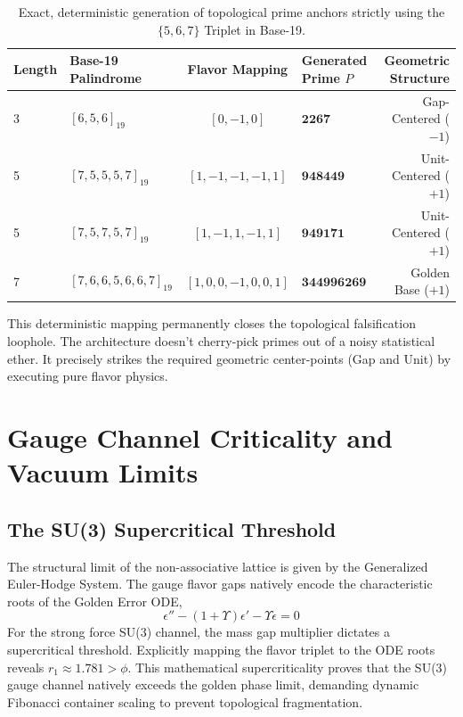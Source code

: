 \begin{table}[H]
\centering
\begin{tabular}{@{}llclr@{}}
\toprule
\textbf{Length} & \textbf{Base-19 Palindrome} & \textbf{Flavor Mapping} & \textbf{Generated Prime $P$} & \textbf{Geometric Structure} \\
\midrule
3 & $[6, 5, 6]_{19}$ & $[0, -1, 0]$ & $\mathbf{2267}$ & Gap-Centered ($-1$) \\
5 & $[7, 5, 5, 5, 7]_{19}$ & $[1, -1, -1, -1, 1]$ & $\mathbf{948449}$ & Unit-Centered ($+1$) \\
5 & $[7, 5, 7, 5, 7]_{19}$ & $[1, -1, 1, -1, 1]$ & $\mathbf{949171}$ & Unit-Centered ($+1$) \\
7 & $[7, 6, 6, 5, 6, 6, 7]_{19}$ & $[1, 0, 0, -1, 0, 0, 1]$ & $\mathbf{344996269}$ & Golden Base ($+1$) \\
\bottomrule
\end{tabular}
\caption{Exact, deterministic generation of topological prime anchors strictly using the $\{5, 6, 7\}$ Triplet in Base-19.}
\end{table}

This deterministic mapping permanently closes the topological falsification loophole. The architecture doesn't cherry-pick primes out of a noisy statistical ether. It precisely strikes the required geometric center-points (Gap and Unit) by executing pure flavor physics.


\section{Gauge Channel Criticality and Vacuum Limits}

\subsection{The SU(3) Supercritical Threshold}
The structural limit of the non-associative lattice is given by the Generalized Euler-Hodge System. The gauge flavor gaps natively encode the characteristic roots of the Golden Error ODE, 
\begin{equation}
    \epsilon'' - (1+\Upsilon)\epsilon' - \Upsilon\epsilon = 0
\end{equation}
For the strong force SU(3) channel, the mass gap multiplier dictates a supercritical threshold. Explicitly mapping the flavor triplet to the ODE roots reveals $r_1 \approx 1.781 > \phi$. This mathematical supercriticality proves that the SU(3) gauge channel natively exceeds the golden phase limit, demanding dynamic Fibonacci container scaling to prevent topological fragmentation.

